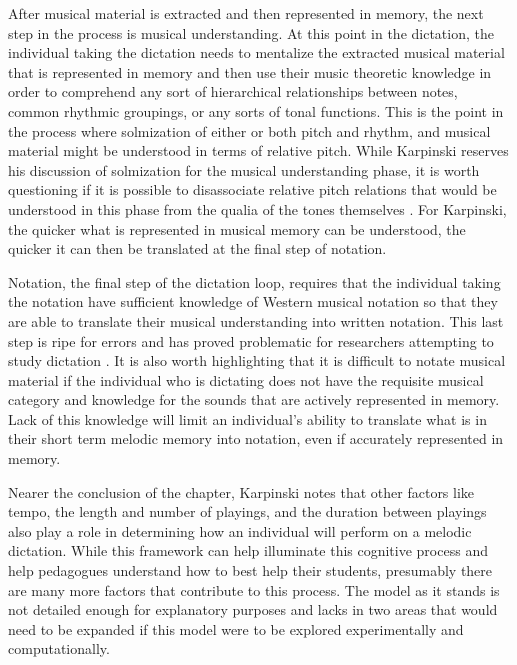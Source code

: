 \documentclass[12pt,]{book}
\begin{document}
After musical material is extracted and then represented in memory, the next step in the process is musical understanding.
At this point in the dictation, the individual taking the dictation needs to mentalize the extracted musical material that is represented in memory and then use their music theoretic knowledge in order to comprehend any sort of hierarchical relationships between notes, common rhythmic groupings, or any sorts of tonal functions.
This is the point in the process where solmization of either or both pitch and rhythm, and musical material might be understood in terms of relative pitch.
While Karpinski reserves his discussion of solmization for the musical understanding phase, it is worth questioning if it is possible to disassociate relative pitch relations that would be understood in this phase from the qualia of the tones themselves \citep{arthurPerceptualStudyScaledegree2018}.
For Karpinski, the quicker what is represented in musical memory can be understood, the quicker it can then be translated at the final step of notation.

Notation, the final step of the dictation loop, requires that the individual taking the notation have sufficient knowledge of Western musical notation so that they are able to translate their musical understanding into written notation.
This last step is ripe for errors and has proved problematic for researchers attempting to study dictation \citep{taylorStrategiesMemoryShort1983, klonoskiImprovingDictationAuralSkills2006}.
It is also worth highlighting that it is difficult to notate musical material if the individual who is dictating does not have the requisite musical category and knowledge for the sounds that are actively represented in memory.
Lack of this knowledge will limit an individual's ability to translate what is in their short term melodic memory into notation, even if accurately represented in memory.

Nearer the conclusion of the chapter, Karpinski notes that other factors like tempo, the length and number of playings, and the duration between playings also play a role in determining how an individual will perform on a melodic dictation.
While this framework can help illuminate this cognitive process and help pedagogues understand how to best help their students, presumably there are many more factors that contribute to this process.
The model as it stands is not detailed enough for explanatory purposes and lacks in two areas that would need to be expanded if this model were to be explored experimentally and computationally.
\end{document}
